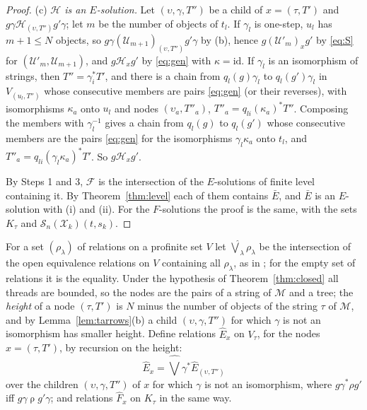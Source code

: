 \documentclass[11pt]{amsart}
\theoremstyle{definition}
\newcommand{\cX}{\mathcal X}
\newcommand{\cM}{\mathcal M}
\newcommand{\cS}{\mathcal S}
\newcommand{\id}{\mathrm{id}}
\begin{document}
\begin{proof}
(c) \emph{$\mathcal H$ is an $E$-solution.} Let $(\upsilon,\gamma,
T'')$ be a child of $x=(\tau,T')$ and $g\gamma\mathrel{\mathcal
H_{(\upsilon,T'')}}g'\gamma$; let $m$ be the number of objects of
$t_l$. If $\gamma_l$ is one-step, $u_l$ has $m+1\le N$ objects, so
$g\gamma\mathrel{(\mathcal U_{m+1})_{(\upsilon,T'')}}g'\gamma$ by
(b), hence $g\mathrel{(\mathcal U'_m)_x}g'$ by \eqref{eq:S} for
$(\mathcal U'_m,\mathcal U_{m+1})$, and $g\mathrel{\mathcal H_x}g'$
by \eqref{eq:gen} with $\kappa=\id$. If $\gamma_l$ is an isomorphism
of strings, then $T''=\gamma_i^*T'$, and there is a chain from
$q_l(g)\gamma_l$ to $q_l(g')\gamma_l$ in $V_{(u_l,T'')}$ whose
consecutive members are pairs \eqref{eq:gen} (or their reverses),
with isomorphisms $\kappa_a$ onto $u_l$ and nodes $(\upsilon_a,
T''_a)$, $T''_a=q_{li}(\kappa_a)^*T''$. Composing the members with
$\gamma_l^{-1}$ gives a chain from $q_l(g)$ to $q_l(g')$ whose
consecutive members are the pairs \eqref{eq:gen} for the
isomorphisms $\gamma_l\kappa_a$ onto $t_l$, and $T''_a=q_{li}(\gamma_l
\kappa_a)^*T'$. So $g\mathrel{\mathcal H_x}g'$.

By Steps 1 and 3, $\mathcal F$ is the intersection of the
$E$-solutions of finite level containing it. By
Theorem~\ref{thm:level} each of them contains $\bar E$, and $\bar E$
is an $E$-solution with (i) and (ii). For the $F$-solutions the proof
is the same, with the sets $K_\tau$ and $\cS_n(\cX_k)(t,s_k)$.
\end{proof}

For a set $(\rho_\lambda)$ of relations on a profinite set $V$ let
$\widehat\bigvee_\lambda\rho_\lambda$ be the intersection of the open
equivalence relations on $V$ containing all $\rho_\lambda$, as in
\cite[\S8]{Proftrees}; for the empty set of relations it is the
equality. Under the hypothesis of Theorem~\ref{thm:closed} all
threads are bounded, so the nodes are the pairs of a string of $\cM$
and a tree; the \emph{height} of a node $(\tau,T')$ is $N$ minus the
number of objects of the string $\tau$ of $\cM$, and by
Lemma~\ref{lem:tarrows}(b) a child $(\upsilon,\gamma,T'')$ for which
$\gamma$ is not an isomorphism has smaller height. Define relations
$\widehat E_x$ on $V_\tau$, for the nodes $x=(\tau,T')$, by recursion
on the height:
\[
\widehat E_x=\widehat\bigvee\gamma^*\widehat E_{(\upsilon,T'')}
\]
over the children $(\upsilon,\gamma,T'')$ of $x$ for which $\gamma$
is not an isomorphism, where $g\mathrel{\gamma^*\rho}g'$ iff
$g\gamma\mathrel\rho g'\gamma$; and relations $\widehat F_x$ on
$K_\tau$ in the same way.
\end{document}
